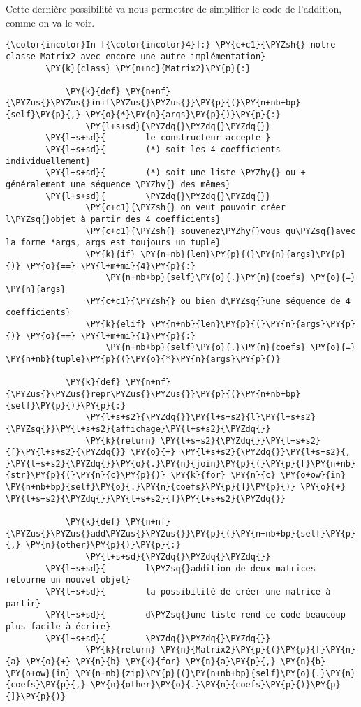 Cette dernière possibilité va nous permettre de simplifier le code de
l'addition, comme on va le voir.

    \begin{Verbatim}[commandchars=\\\{\},frame=single,framerule=0.3mm,rulecolor=\color{cellframecolor}]
{\color{incolor}In [{\color{incolor}4}]:} \PY{c+c1}{\PYZsh{} notre classe Matrix2 avec encore une autre implémentation}
        \PY{k}{class} \PY{n+nc}{Matrix2}\PY{p}{:}
        
            \PY{k}{def} \PY{n+nf}{\PYZus{}\PYZus{}init\PYZus{}\PYZus{}}\PY{p}{(}\PY{n+nb+bp}{self}\PY{p}{,} \PY{o}{*}\PY{n}{args}\PY{p}{)}\PY{p}{:}
                \PY{l+s+sd}{\PYZdq{}\PYZdq{}\PYZdq{}}
        \PY{l+s+sd}{        le constructeur accepte }
        \PY{l+s+sd}{        (*) soit les 4 coefficients individuellement}
        \PY{l+s+sd}{        (*) soit une liste \PYZhy{} ou + généralement une séquence \PYZhy{} des mêmes}
        \PY{l+s+sd}{        \PYZdq{}\PYZdq{}\PYZdq{}}
                \PY{c+c1}{\PYZsh{} on veut pouvoir créer l\PYZsq{}objet à partir des 4 coefficients}
                \PY{c+c1}{\PYZsh{} souvenez\PYZhy{}vous qu\PYZsq{}avec la forme *args, args est toujours un tuple}
                \PY{k}{if} \PY{n+nb}{len}\PY{p}{(}\PY{n}{args}\PY{p}{)} \PY{o}{==} \PY{l+m+mi}{4}\PY{p}{:}
                    \PY{n+nb+bp}{self}\PY{o}{.}\PY{n}{coefs} \PY{o}{=} \PY{n}{args}
                \PY{c+c1}{\PYZsh{} ou bien d\PYZsq{}une séquence de 4 coefficients}
                \PY{k}{elif} \PY{n+nb}{len}\PY{p}{(}\PY{n}{args}\PY{p}{)} \PY{o}{==} \PY{l+m+mi}{1}\PY{p}{:}
                    \PY{n+nb+bp}{self}\PY{o}{.}\PY{n}{coefs} \PY{o}{=} \PY{n+nb}{tuple}\PY{p}{(}\PY{o}{*}\PY{n}{args}\PY{p}{)}
        
            \PY{k}{def} \PY{n+nf}{\PYZus{}\PYZus{}repr\PYZus{}\PYZus{}}\PY{p}{(}\PY{n+nb+bp}{self}\PY{p}{)}\PY{p}{:}
                \PY{l+s+s2}{\PYZdq{}}\PY{l+s+s2}{l}\PY{l+s+s2}{\PYZsq{}}\PY{l+s+s2}{affichage}\PY{l+s+s2}{\PYZdq{}}
                \PY{k}{return} \PY{l+s+s2}{\PYZdq{}}\PY{l+s+s2}{[}\PY{l+s+s2}{\PYZdq{}} \PY{o}{+} \PY{l+s+s2}{\PYZdq{}}\PY{l+s+s2}{, }\PY{l+s+s2}{\PYZdq{}}\PY{o}{.}\PY{n}{join}\PY{p}{(}\PY{p}{[}\PY{n+nb}{str}\PY{p}{(}\PY{n}{c}\PY{p}{)} \PY{k}{for} \PY{n}{c} \PY{o+ow}{in} \PY{n+nb+bp}{self}\PY{o}{.}\PY{n}{coefs}\PY{p}{]}\PY{p}{)} \PY{o}{+} \PY{l+s+s2}{\PYZdq{}}\PY{l+s+s2}{]}\PY{l+s+s2}{\PYZdq{}}
        
            \PY{k}{def} \PY{n+nf}{\PYZus{}\PYZus{}add\PYZus{}\PYZus{}}\PY{p}{(}\PY{n+nb+bp}{self}\PY{p}{,} \PY{n}{other}\PY{p}{)}\PY{p}{:}
                \PY{l+s+sd}{\PYZdq{}\PYZdq{}\PYZdq{}}
        \PY{l+s+sd}{        l\PYZsq{}addition de deux matrices retourne un nouvel objet}
        \PY{l+s+sd}{        la possibilité de créer une matrice à partir}
        \PY{l+s+sd}{        d\PYZsq{}une liste rend ce code beaucoup plus facile à écrire}
        \PY{l+s+sd}{        \PYZdq{}\PYZdq{}\PYZdq{}}
                \PY{k}{return} \PY{n}{Matrix2}\PY{p}{(}\PY{p}{[}\PY{n}{a} \PY{o}{+} \PY{n}{b} \PY{k}{for} \PY{n}{a}\PY{p}{,} \PY{n}{b} \PY{o+ow}{in} \PY{n+nb}{zip}\PY{p}{(}\PY{n+nb+bp}{self}\PY{o}{.}\PY{n}{coefs}\PY{p}{,} \PY{n}{other}\PY{o}{.}\PY{n}{coefs}\PY{p}{)}\PY{p}{]}\PY{p}{)}
        

\end{Verbatim}
